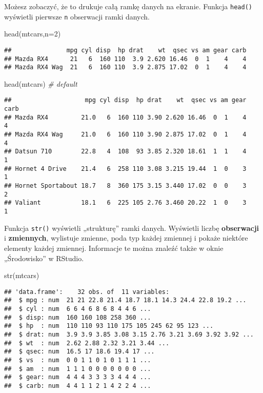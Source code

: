 \documentclass[
]{article}
\newenvironment{Shaded}{\begin{snugshade}}{\end{snugshade}}
\newcommand{\AttributeTok}[1]{\textcolor[rgb]{0.77,0.63,0.00}{#1}}
\newcommand{\CommentTok}[1]{\textcolor[rgb]{0.56,0.35,0.01}{\textit{#1}}}
\newcommand{\DecValTok}[1]{\textcolor[rgb]{0.00,0.00,0.81}{#1}}
\newcommand{\FunctionTok}[1]{\textcolor[rgb]{0.00,0.00,0.00}{#1}}
\newcommand{\NormalTok}[1]{#1}
\begin{document}
Możesz zobaczyć, że to drukuje całą ramkę danych na ekranie. Funkcja
\texttt{head()} wyświetli pierwsze \texttt{n} obserwacji ramki danych.

\begin{Shaded}
\begin{Highlighting}[]
\FunctionTok{head}\NormalTok{(mtcars,}\AttributeTok{n=}\DecValTok{2}\NormalTok{)}
\end{Highlighting}
\end{Shaded}

\begin{verbatim}
##               mpg cyl disp  hp drat    wt  qsec vs am gear carb
## Mazda RX4      21   6  160 110  3.9 2.620 16.46  0  1    4    4
## Mazda RX4 Wag  21   6  160 110  3.9 2.875 17.02  0  1    4    4
\end{verbatim}

\begin{Shaded}
\begin{Highlighting}[]
\FunctionTok{head}\NormalTok{(mtcars) }\CommentTok{\# default}
\end{Highlighting}
\end{Shaded}

\begin{verbatim}
##                    mpg cyl disp  hp drat    wt  qsec vs am gear carb
## Mazda RX4         21.0   6  160 110 3.90 2.620 16.46  0  1    4    4
## Mazda RX4 Wag     21.0   6  160 110 3.90 2.875 17.02  0  1    4    4
## Datsun 710        22.8   4  108  93 3.85 2.320 18.61  1  1    4    1
## Hornet 4 Drive    21.4   6  258 110 3.08 3.215 19.44  1  0    3    1
## Hornet Sportabout 18.7   8  360 175 3.15 3.440 17.02  0  0    3    2
## Valiant           18.1   6  225 105 2.76 3.460 20.22  1  0    3    1
\end{verbatim}

Funkcja \texttt{str()} wyświetli „strukturę'' ramki danych. Wyświetli
liczbę \textbf{obserwacji} i \textbf{zmiennych}, wylistuje zmienne, poda
typ każdej zmiennej i pokaże niektóre elementy każdej zmiennej.
Informacje te można znaleźć także w oknie „Środowisko'' w RStudio.

\begin{Shaded}
\begin{Highlighting}[]
\FunctionTok{str}\NormalTok{(mtcars)}
\end{Highlighting}
\end{Shaded}

\begin{verbatim}
## 'data.frame':    32 obs. of  11 variables:
##  $ mpg : num  21 21 22.8 21.4 18.7 18.1 14.3 24.4 22.8 19.2 ...
##  $ cyl : num  6 6 4 6 8 6 8 4 4 6 ...
##  $ disp: num  160 160 108 258 360 ...
##  $ hp  : num  110 110 93 110 175 105 245 62 95 123 ...
##  $ drat: num  3.9 3.9 3.85 3.08 3.15 2.76 3.21 3.69 3.92 3.92 ...
##  $ wt  : num  2.62 2.88 2.32 3.21 3.44 ...
##  $ qsec: num  16.5 17 18.6 19.4 17 ...
##  $ vs  : num  0 0 1 1 0 1 0 1 1 1 ...
##  $ am  : num  1 1 1 0 0 0 0 0 0 0 ...
##  $ gear: num  4 4 4 3 3 3 3 4 4 4 ...
##  $ carb: num  4 4 1 1 2 1 4 2 2 4 ...
\end{verbatim}
\end{document}
